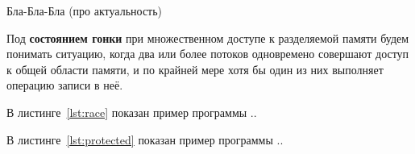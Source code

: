 \Introduction

Бла-Бла-Бла (про актуальность)

Под \textbf{состоянием гонки} при множественном доступе к разделяемой памяти будем понимать ситуацию, когда два или более потоков одновремено совершают доступ к общей области памяти, и по крайней мере хотя бы один из них выполняет операцию записи в неё. 





В листинге~\ref{lst:race} показан пример программы ..

В листинге~\ref{lst:protected} показан пример программы ..
